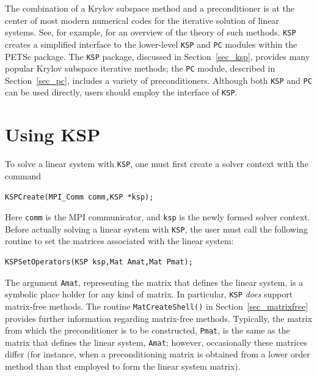 The combination of a Krylov subspace method and a preconditioner is at
the center of most modern numerical codes for the iterative solution of
linear systems.  See, for example, \cite{fgn} for an overview of the theory
of such methods.  \lstinline{KSP} creates a simplified interface to the
lower-level \lstinline{KSP} and \lstinline{PC} modules within the PETSc package.  The \lstinline{KSP} package,
discussed in
Section~\ref{sec_ksp}, provides many popular Krylov
 subspace iterative methods;
the \lstinline{PC} module, described in Section~\ref{sec_pc}, includes a
variety of preconditioners.  Although both  \lstinline{KSP} and \lstinline{PC} can be used
directly, users should employ the interface of \lstinline{KSP}.

\section{Using KSP}
\label{sec_usingsles}

To solve a linear system with \lstinline{KSP}, one must first create a solver context
with the command
\begin{lstlisting}
KSPCreate(MPI_Comm comm,KSP *ksp);
\end{lstlisting}
Here \lstinline{comm} is the MPI communicator, and \lstinline{ksp} is the newly
formed solver context.
Before actually solving a linear system with \lstinline{KSP}, the user must call
the following routine to set the matrices associated with the linear
system:
\begin{lstlisting}
KSPSetOperators(KSP ksp,Mat Amat,Mat Pmat);
\end{lstlisting}
The argument \lstinline{Amat}, representing the matrix that defines the
linear system, is a symbolic place holder for any kind of matrix.
In particular, \lstinline{KSP} {\em does} support matrix-free methods.
The routine \lstinline{MatCreateShell()}
in Section~\ref{sec_matrixfree} provides further information regarding
matrix-free methods.
Typically, the matrix from which the
preconditioner is to be constructed, \lstinline{Pmat}, is the same as
the matrix that defines the linear system, \lstinline{Amat}; however,
occasionally these matrices differ (for instance, 
when a preconditioning matrix is obtained from a lower order method than
that employed to form the linear system matrix).

